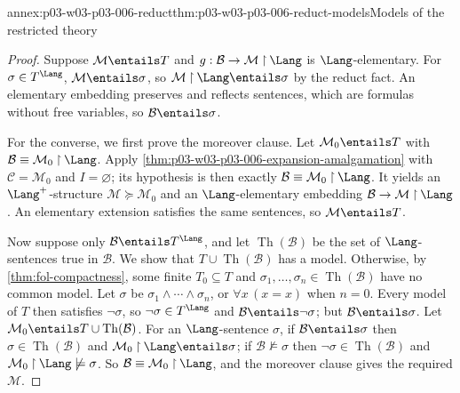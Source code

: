 \begin{annexitem}{annex:p03-w03-p03-006-reduct}{thm:p03-w03-p03-006-reduct-models}{Models of the restricted theory}
\begin{proof}
Suppose \(\mathcal M\entails T\) and
\(g:\mathcal B\to\mathcal M\mathbin{\upharpoonright}\Lang\) is
\(\Lang\)-elementary.  For \(\sigma\in T^{\Lang}\),
\(\mathcal M\entails\sigma\), so
\(\mathcal M\mathbin{\upharpoonright}\Lang\entails\sigma\) by the reduct
fact.  An elementary embedding preserves and reflects sentences, which are
formulas without free variables, so \(\mathcal B\entails\sigma\).

For the converse, we first prove the moreover clause.  Let
\(\mathcal M_0\entails T\) with
\(\mathcal B\equiv\mathcal M_0\mathbin{\upharpoonright}\Lang\).  Apply
\cref{thm:p03-w03-p03-006-expansion-amalgamation} with
\(\mathcal C=\mathcal M_0\) and \(I=\varnothing\); its hypothesis is then
exactly \(\mathcal B\equiv\mathcal M_0\mathbin{\upharpoonright}\Lang\).  It
yields an \(\Lang^+\)-structure \(\mathcal M\succcurlyeq\mathcal M_0\) and
an \(\Lang\)-elementary embedding
\(\mathcal B\to\mathcal M\mathbin{\upharpoonright}\Lang\).  An elementary
extension satisfies the same sentences, so \(\mathcal M\entails T\).

Now suppose only \(\mathcal B\entails T^{\Lang}\), and let
\(\operatorname{Th}(\mathcal B)\) be the set of \(\Lang\)-sentences true in
\(\mathcal B\).  We show that \(T\cup\operatorname{Th}(\mathcal B)\) has a
model.  Otherwise, by \cref{thm:fol-compactness}, some finite
\(T_0\subseteq T\) and \(\sigma_1,\ldots,\sigma_n\in\operatorname{Th}(\mathcal B)\)
have no common model.  Let \(\sigma\) be \(\sigma_1\land\cdots\land\sigma_n\),
or \(\forall x\,(x=x)\) when \(n=0\).  Every model of \(T\) then satisfies
\(\neg\sigma\), so \(\neg\sigma\in T^{\Lang}\) and
\(\mathcal B\entails\neg\sigma\); but \(\mathcal B\entails\sigma\).  Let
\(\mathcal M_0\entails T\cup\operatorname{Th}(\mathcal B)\).  For an
\(\Lang\)-sentence \(\sigma\), if \(\mathcal B\entails\sigma\) then
\(\sigma\in\operatorname{Th}(\mathcal B)\) and
\(\mathcal M_0\mathbin{\upharpoonright}\Lang\entails\sigma\); if
\(\mathcal B\not\models\sigma\) then
\(\neg\sigma\in\operatorname{Th}(\mathcal B)\) and
\(\mathcal M_0\mathbin{\upharpoonright}\Lang\not\models\sigma\).  So
\(\mathcal B\equiv\mathcal M_0\mathbin{\upharpoonright}\Lang\), and the
moreover clause gives the required \(\mathcal M\).
\end{proof}
\end{annexitem}

